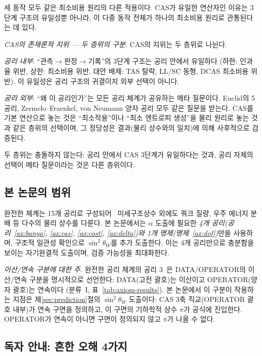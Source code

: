 \documentclass[entropy,article,submit,pdftex,oneauthor]{Definitions/mdpi}
\begin{document}
세 동작 모두 같은 최소비용 원리의 다른 적용이다. CAS가 유일한 연산자인 이유는 3단계 구조의 유일성뿐 아니라, 이 다중 동작 전체가 하나의 최소비용 원리로 관통된다는 데 있다.

\emph{CAS의 존재론적 지위 --- 두 층위의 구분.} CAS의 지위는 두 층위로 나뉜다.

\emph{공리 내부}: ``관측$\to$판정$\to$기록''의 3단계 구조는 공리 안에서 유일하다 (하한: 인과율 위반, 상한: 최소비용 위반, 대안 배제: TAS 탈락, LL/SC 동형, DCAS 최소비용 위반). 이 유일성은 공리 구조의 귀결이지 외부 선택이 아니다.

\emph{공리 외부}: ``왜 이 공리인가''는 모든 공리 체계가 공유하는 메타 질문이다. Euclid의 5공리, Zermelo--Fraenkel, von Neumann 양자 공리 모두 같은 질문을 받는다. CAS를 기본 연산으로 놓는 것은 ``최소작용''이나 ``최소 엔트로피 생성''을 물리 원리로 놓는 것과 같은 층위의 선택이며, 그 정당성은 결과(물리 상수와의 일치)에 의해 사후적으로 검증된다.

두 층위는 충돌하지 않는다: 공리 안에서 CAS 3단계가 유일하다는 것과, 공리 자체의 선택이 메타 질문이라는 것은 다른 층위이다.

\subsection{본 논문의 범위}

완전한 체계는 15개 공리로 구성되어~\cite{han2026} 미세구조상수 외에도 쿼크 질량, 우주 에너지 분배 등 다수의 물리 상수를 다룬다. 본 논문에서는 $\alpha$ 도출에 필요한 \emph{4개 공리(공리~\ref{ax:banya}, \ref{ax:cas}, \ref{ax:cost}, \ref{ax:delta})와 1개 명제(명제~\ref{ax:dof})}만을 사용하며, 구조적 일관성 확인으로 $\sin^2\theta_W$를 추가 도출한다. 이는 4개 공리만으로 충분함을 보이는 자기완결적 도출이며, 검증 가능성을 최대화한다.

\emph{이산/연속 구분에 대한 주.} 완전한 공리 체계의 공리 3~\cite{han2026}은 DATA/OPERATOR의 이산/연속 구분을 명시적으로 선언한다: DATA(고전 괄호)는 이산이고 OPERATOR(양자 괄호)는 연속이다 (분류~I, 표~\ref{tab:axiom-results}). 본 논문에서 이 구분이 작용하는 지점은 제\ref{sec:prediction}절의 $\sin^2\theta_W$ 도출이다: CAS 3축 직교(OPERATOR 괄호 내부)가 연속 구면을 정의하고, 이 구면의 기하학적 상수 $\pi$가 공식에 진입한다. OPERATOR가 연속이 아니면 구면이 정의되지 않고 $\pi$가 나올 수 없다.

\subsection{독자 안내: 흔한 오해 4가지}
\end{document}
